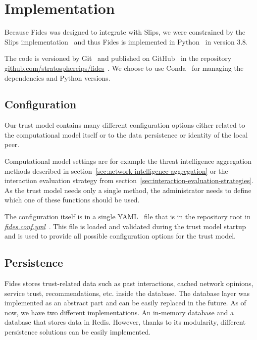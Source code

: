 \section{Implementation}
\label{sec:implementation}
Because Fides was designed to integrate with Slips, we were constrained by the Slips implementation~\cite{slips} and thus Fides is implemented in Python~\cite{python} in version 3.8.

The code is versioned by Git~\cite{git} and published on GitHub~\cite{github} in the repository \href{https://github.com/stratosphereips/fides}{github.com/stratosphereips/fides}~\cite{fidesGithub}.
We choose to use Conda~\cite{conda} for managing the dependencies and Python versions.

\subsection{Configuration}
\label{subsec:configuration}
Our trust model contains many different configuration options either related to the computational model itself or to the data persistence or identity of the local peer.

Computational model settings are for example the threat intelligence aggregation methods described in section~\ref{sec:network-intelligence-aggregation} or the interaction evaluation strategy from section~\ref{sec:interaction-evaluation-strategies}.
As the trust model needs only a single method, the administrator needs to define which one of these functions should be used.

The configuration itself is in a single YAML~\cite{yaml} file that is in the repository root in \href{https://github.com/LukasForst/fides/blob/master/fides.conf.yml}{\textit{fides.conf.yml}}~\cite{fidesGithub}.
This file is loaded and validated during the trust model startup and is used to provide all possible configuration options for the trust model.

\subsection{Persistence}
\label{subsec:persistence}
Fides stores trust-related data such as past interactions, cached network opinions, service trust, recommendations, etc. inside the database.
The database layer was implemented as an abstract part and can be easily replaced in the future.
As of now, we have two different implementations. An in-memory database and a database that stores data in Redis.
However, thanks to its modularity, different persistence solutions can be easily implemented.

